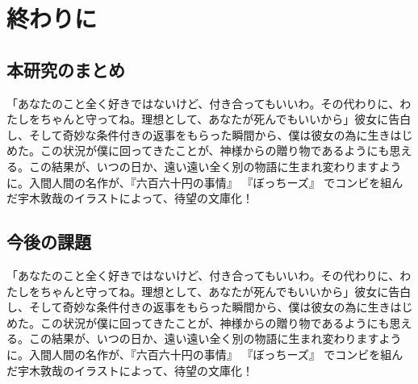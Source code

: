\chapter{終わりに}

\section{本研究のまとめ}

「あなたのこと全く好きではないけど、付き合ってもいいわ。その代わりに、わたしをちゃんと守ってね。理想として、あなたが死んでもいいから」彼女に告白し、そして奇妙な条件付きの返事をもらった瞬間から、僕は彼女の為に生きはじめた。この状況が僕に回ってきたことが、神様からの贈り物であるようにも思える。この結果が、いつの日か、遠い遠い全く別の物語に生まれ変わりますように。入間人間の名作が、『六百六十円の事情』 『ぼっちーズ』 でコンビを組んだ宇木敦哉のイラストによって、待望の文庫化！

\section{今後の課題}

「あなたのこと全く好きではないけど、付き合ってもいいわ。その代わりに、わたしをちゃんと守ってね。理想として、あなたが死んでもいいから」彼女に告白し、そして奇妙な条件付きの返事をもらった瞬間から、僕は彼女の為に生きはじめた。この状況が僕に回ってきたことが、神様からの贈り物であるようにも思える。この結果が、いつの日か、遠い遠い全く別の物語に生まれ変わりますように。入間人間の名作が、『六百六十円の事情』 『ぼっちーズ』 でコンビを組んだ宇木敦哉のイラストによって、待望の文庫化！

